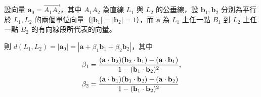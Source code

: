 \begin{prop}
\label{prop:b3s-5-3}
設向量 $\mathbf{a}_0 = \vec{A_1A_2}$，其中 $A_1A_2$ 為直線 $L_1$ 與 $L_2$ 的公垂線，設 $\mathbf{b}_1, \mathbf{b}_2$ 分別為平行於 $L_1, L_2$ 的兩個單位向量（$|\mathbf{b}_1| = |\mathbf{b}_2| = 1$），而 $\mathbf{a}$ 為 $L_1$ 上任一點 $B_1$ 到 $L_2$ 上任一點 $B_2$ 的有向線段所代表的向量。

則 $d(L_1, L_2) = |\mathbf{a}_0| = |\mathbf{a} + \beta_1 \mathbf{b}_1 + \beta_2 \mathbf{b}_2|$，其中
\begin{align}
\beta_1 &= \frac{(\mathbf{a} \cdot \mathbf{b}_2)(\mathbf{b}_2 \cdot \mathbf{b}_1) - (\mathbf{a} \cdot \mathbf{b}_1)}{1 - (\mathbf{b}_1 \cdot \mathbf{b}_2)^2}, \notag \\
\beta_2 &= \frac{(\mathbf{a} \cdot \mathbf{b}_1)(\mathbf{b}_1 \cdot \mathbf{b}_2) - (\mathbf{a} \cdot \mathbf{b}_2)}{1 - (\mathbf{b}_1 \cdot \mathbf{b}_2)^2} \label{eq:b3s-5-7}
\end{align}
\end{prop}

